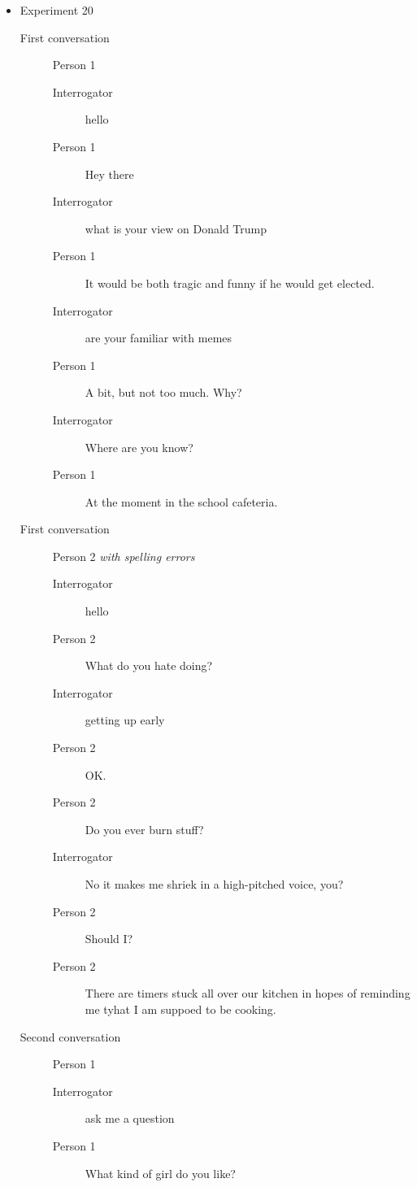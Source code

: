 \begin{itemize}
   \item Experiment 20
      \begin{description}
         \item [First conversation] Person 1
            \begin{description}
               \item [Interrogator] hello
               \item [Person 1] Hey there
               \item [Interrogator] what is your view on Donald Trump
               \item [Person 1] It would be both tragic and funny if he would get elected.
               \item [Interrogator] are your familiar with memes
               \item [Person 1] A bit, but not too much. Why?
               \item [Interrogator] Where are you know?
               \item [Person 1] At the moment in the school cafeteria.
            \end{description}
         \item [First conversation] Person 2 \textit{with spelling errors}
            \begin{description}
               \item [Interrogator] hello
               \item [Person 2] What do you hate doing?
               \item [Interrogator] getting up early
               \item [Person 2] OK.
               \item [Person 2] Do you ever burn stuff?
               \item [Interrogator] No it makes me shriek in a high-pitched voice, you?
               \item [Person 2] Should I?
               \item [Person 2] There are timers stuck all over our kitchen in hopes of reminding me tyhat I am suppoed to be cooking.
            \end{description}
         \item [Second conversation] Person 1
            \begin{description}
               \item [Interrogator] ask me a question
               \item [Person 1] What kind of girl do you like?

\end{description}
\end{description}
\end{itemize}
